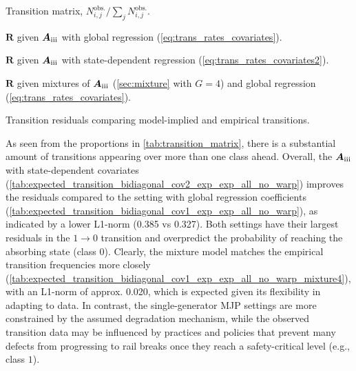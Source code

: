 \documentclass{article}
\newcommand{\RN}[1]{\textup{\uppercase\expandafter{\romannumeral#1}}}
\begin{document}
\begin{table}[h]
    \begin{subtable}[h]{0.45\textwidth}
        \centering
            
          \caption{Transition matrix, $ N_{i,j}^{\text{obs.}} / \sum_{j}  N_{i,j}^{\text{obs.}}$.}
       \label{tab:transition_matrix}
    \end{subtable}
    \hfill
    \begin{subtable}[h]{0.45\textwidth}
        \centering
       
        \caption{$\bm R$ given $\bm{A}_{\RN{3}}$ with global regression (\cref{eq:trans_rates_covariates}).}
        \label{tab:expected_transition_bidiagonal_cov1_exp_exp_all_no_warp}
     \end{subtable}
      \begin{subtable}[h]{0.45\textwidth} 
        \centering
         
        \caption{$\bm R$ given $\bm{A}_{\RN{3}}$ with state-dependent regression (\cref{eq:trans_rates_covariates2}).}
        \label{tab:expected_transition_bidiagonal_cov2_exp_exp_all_no_warp}
     \end{subtable}
     \hfill 
     \begin{subtable}[h]{0.45\textwidth} 
        \centering 
 
        \caption{$\bm R$ given mixtures of $\bm{A}_{\RN{3}}$ (\cref{sec:mixture} with $G = 4$) and global regression (\cref{eq:trans_rates_covariates}).}
        \label{tab:expected_transition_bidiagonal_cov1_exp_exp_all_no_warp_mixture4}
     \end{subtable} 
     \caption{Transition residuals comparing model-implied and empirical transitions.}
     \label{tab:transition_patterns}
\end{table}


As seen from the proportions in \cref{tab:transition_matrix}, there is a substantial amount of transitions appearing over more than one class ahead. Overall, the $\bm{A}_{\RN{3}}$ with state-dependent covariates (\cref{tab:expected_transition_bidiagonal_cov2_exp_exp_all_no_warp}) improves the residuals compared to the setting with global regression coefficients (\cref{tab:expected_transition_bidiagonal_cov1_exp_exp_all_no_warp}), as indicated by a lower L1-norm (0.385 vs 0.327). Both settings have their largest residuals in the $1 \rightarrow 0$ transition and overpredict the probability of reaching the absorbing state (class $0$). Clearly, the mixture model matches the empirical transition frequencies more closely (\cref{tab:expected_transition_bidiagonal_cov1_exp_exp_all_no_warp_mixture4}), with an L1-norm of approx. 0.020, which is expected given its flexibility in adapting to data. In contrast, the single-generator MJP settings are more constrained by the assumed degradation mechanism, while the observed transition data may be influenced by practices and policies that prevent many defects from progressing to rail breaks once they reach a safety-critical level (e.g., class $1$).
\end{document}
